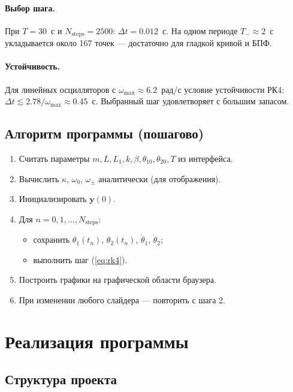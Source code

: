 \documentclass[12pt,a4paper]{article}
\begin{document}
\paragraph{Выбор шага.} При \(T=30\)~с и \(N_{\mathrm{steps}}=2500\):
\(\Delta t=0.012\)~с. На одном периоде \(T_-\approx2\)~с укладывается около
167 точек --- достаточно для гладкой кривой и БПФ.

\paragraph{Устойчивость.} Для линейных осцилляторов с \(\omega_{\max}\approx6.2\)~рад/с
условие устойчивости РК4: \(\Delta t\lesssim 2.78/\omega_{\max}\approx0.45\)~с.
Выбранный шаг удовлетворяет с большим запасом.

\subsection{Алгоритм программы (пошагово)}

\begin{enumerate}
  \item Считать параметры \(m,L,L_1,k,\beta,\theta_{10},\theta_{20},T\) из интерфейса.
  \item Вычислить \(\kappa\), \(\omega_0\), \(\omega_\pm\) аналитически (для отображения).
  \item Инициализировать \(\mathbf{y}(0)\).
  \item Для \(n=0,1,\ldots,N_{\mathrm{steps}}\):
  \begin{itemize}
    \item сохранить \(\theta_1(t_n)\), \(\theta_2(t_n)\), \(\dot\theta_1\), \(\dot\theta_2\);
    \item выполнить шаг (\ref{eq:rk4}).
  \end{itemize}
  \item Построить графики на графической области браузера.
  \item При изменении любого слайдера --- повторить с шага 2.
\end{enumerate}

\section{Реализация программы}

\subsection{Структура проекта}
\end{document}
